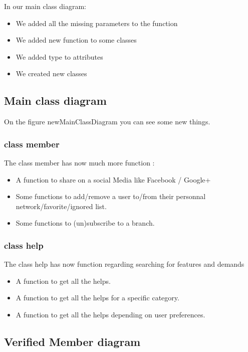 \documentclass[11pt, a4paper]{article}   	%
\begin{document}
In our main class diagram:

\begin{itemize}
\item We added all the missing parameters to the function
\item We added new function to some classes 
\item We added type to attributes
\item We created new classes 
\end{itemize}



\subsection{Main class diagram}

On the figure {newMainClassDiagram} you can see some new things.

\subsubsection{class member}

The class member has now much more function :
\begin{itemize}
\item A function to share on a social Media like Facebook / Google+
\item Some functions to add/remove a user to/from their personnal network/favorite/ignored list.
\item Some functions to (un)subscribe to a branch.
\end{itemize}

\subsubsection{class help}

The class help has now function regarding searching for features and demands
\begin{itemize}
\item A function to get all the helps.
\item A function to get all the helps for a specific category.
\item A function to get all the helps depending on user preferences.
\end{itemize}

\subsection{Verified Member diagram}
\end{document}
